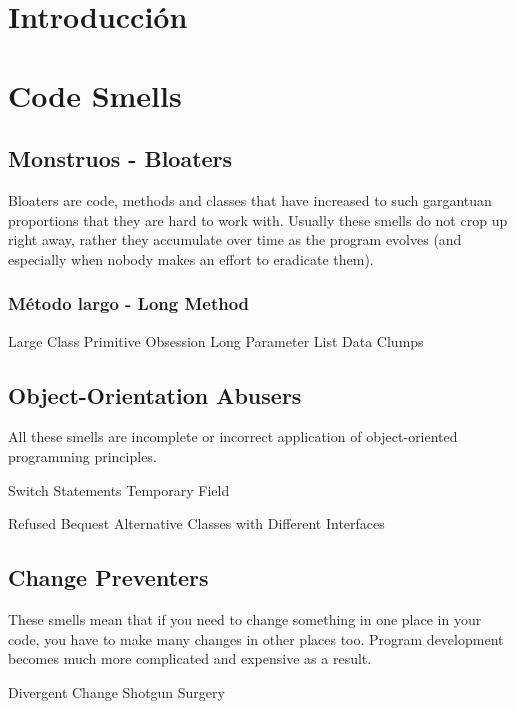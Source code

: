 \documentclass[11pt,a4paper,oneside]{book}
\begin{document}
\tableofcontents %
 
\chapter{Introducción}

\chapter{Code Smells}

\section{Monstruos - Bloaters}

Bloaters are code, methods and classes that have increased to such gargantuan proportions that they are hard to work with. Usually these smells do not crop up right away, rather they accumulate over time as the program evolves (and especially when nobody makes an effort to eradicate them).

\subsection{Método largo -   Long Method}
    Large Class
    Primitive Obsession
    Long Parameter List
    Data Clumps




\section{Object-Orientation Abusers}

All these smells are incomplete or incorrect application of object-oriented programming principles.

    Switch Statements
    Temporary Field

    Refused Bequest
    Alternative Classes with Different Interfaces





\section{Change Preventers}

These smells mean that if you need to change something in one place in your code, you have to make many changes in other places too. Program development becomes much more complicated and expensive as a result.

    Divergent Change
    Shotgun Surgery
\end{document}

